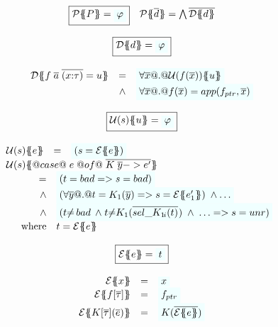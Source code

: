 \begin{figure}\small
\setlength{\arraycolsep}{2pt}
\[\begin{array}{c}
\ruleform{\ptrans{\Sigma}{P} = \formula{\phi} } \quad
\ptrans{\Sigma}{\ol{d}} = \bigwedge \ol{\dtrans{\Sigma}{d}}
\\ \\
\ruleform{\dtrans{\Sigma}{d} = \formula{\phi}} \\ \\
\begin{array}{rcl}
  \dtrans{\Sigma}{f \;\ol{a}\;\ol{(x{:}\tau)} = u}
    & =     & \formula{\forall \ol{x} @.@ \utrans{\sigma}{u}{f(\ol{x})}} \\
    & \land & \formula{\forall \ol{x} @.@ f(\ol{x}) = app(f_{ptr},\xs)} \\
\end{array}
\\ \\
\ruleform{\utrans{\Sigma}{u}{s} = \formula{\phi}} \\ \\
\begin{array}{rcl}
\utrans{\Sigma}{e}{s}
  & = & \formula{(s = \etrans{\Sigma}{\Gamma}{e})} \\
\multicolumn{3}{l}{\utrans{\Sigma}
    {@case@\;e\;@of@\;\ol{K\;\ol{y} -> e'}}{s}} \\
\multicolumn{3}{l}{
\quad
  \begin{array}[t]{rl}
    = & \formula{(t = \bad => s = bad)} \\
    \land & \formula{(\forall \ol{y} @.@ t = K_1(\ol{y}) => s = \etrans{\Sigma}{\Gamma}{e'_1})\;\land \ldots}  \\
    \land & \formula{(t{\neq}\bad\;\land\;
                 t{\neq}K_1(\oln{{\sel{K_1}{i}}(t)}{})\;\land\;\ldots => s=\unr)} \\
    \mbox{where} & t  =  \etrans{\Sigma}{\Gamma}{e}
 \end{array}
}
\end{array}
\\ \\
\ruleform{\etrans{\Sigma}{\Gamma}{e} = \formula{t} } \\ \\
\begin{array}{rcl}
\etrans{\Sigma}{\Gamma}{x} & = & \formula{x} \\
\etrans{\Sigma}{\Gamma}{f[\ol{\tau}]} & = & \formula{f_{ptr}} \\
\etrans{\Sigma}{\Gamma}{K[\ol{\tau}](\ol{e})} & = & \formula{K(\ol{\etrans{\Sigma}{\Gamma}{e}})} \\

\end{array}
\end{array}\]
\end{figure}
